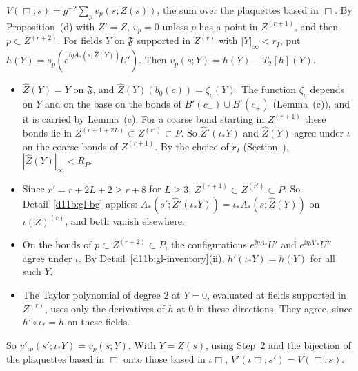 \begin{step}[Interaction]
$V(\Box;s)=g^{-2}\sum_pv_p(s;Z(s))$, the sum over the plaquettes based in $\Box$. By Proposition~(d) with $Z'=Z$, $v_p=0$ unless $p$ has a point in $Z^{(r+1)}$, and then $p\subset Z^{(r+2)}$. For fields $Y$ on $\mathfrak F$ supported in $Z^{(r)}$ with $|Y|_\infty<r_I$, put $h(Y)=s_p(e^{\ii\eta A_*(s;\hat Z(Y))}U')$. Then $v_p(s;Y)=h(Y)-T_2[h](Y)$.
\begin{itemize}
\item $\hat Z(Y)=Y$ on $\mathfrak F$, and $\hat Z(Y)(b_0(c))=\zeta_c(Y)$. The function $\zeta_c$ depends on $Y$ and on the base on the bonds of $B'(c_-)\cup B'(c_+)$ (Lemma~(c)), and it is carried by Lemma~(c). For a coarse bond starting in $Z^{(r+1)}$ these bonds lie in $Z^{(r+1+2L)}\subset Z^{(r')}\subset P$. So $\hat Z'(\iota_*Y)$ and $\hat Z(Y)$ agree under $\iota$ on the coarse bonds of $Z^{(r+1)}$. By the choice of $r_I$ (Section~), $|\hat Z(Y)|_\infty<R_P$.
\item Since $r'=r+2L+2\ge r+8$ for $L\ge3$, $Z^{(r+4)}\subset Z^{(r')}\subset P$. So Detail~\ref{d11b:gl-bg} applies: $A_*(s';\hat Z'(\iota_*Y))=\iota_*A_*(s;\hat Z(Y))$ on $\iota(Z)^{(r)}$, and both vanish elsewhere.
\item On the bonds of $p\subset Z^{(r+2)}\subset P$, the configurations $e^{\ii\eta A_*}U'$ and $e^{\ii\eta A'_*}U''$ agree under $\iota$. By Detail~\ref{d11b:gl-inventory}(ii), $h'(\iota_*Y)=h(Y)$ for all such $Y$.
\item The Taylor polynomial of degree $2$ at $Y=0$, evaluated at fields supported in $Z^{(r)}$, uses only the derivatives of $h$ at $0$ in these directions. They agree, since $h'\circ\iota_*=h$ on these fields.
\end{itemize}
So $v'_{\iota p}(s';\iota_*Y)=v_p(s;Y)$. With $Y=Z(s)$, using Step~2 and the bijection of the plaquettes based in $\Box$ onto those based in $\iota\Box$, $V'(\iota\Box;s')=V(\Box;s)$.
\end{step}

